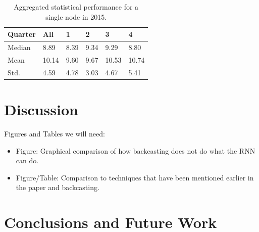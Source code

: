 \documentclass[sigconf]{acmart}
\begin{document}
\begin{table}[h]
\begin{tabular}{llllll}
\hline
Quarter & All   & 1    & 2    & 3     & 4     \\
\hline
Median  & 8.89  & 8.39 & 9.34 & 9.29  & 8.80  \\
Mean    & 10.14 & 9.60 & 9.67 & 10.53 & 10.74 \\
Std.    & 4.59  & 4.78 & 3.03 & 4.67  & 5.41 \\
\hline
\end{tabular}
\caption{Aggregated statistical performance for a single node in 2015.}
\label{tab:single}
\end{table}


\section{Discussion}
\label{sec:discussion}

Figures and Tables we will need:
\begin{itemize}
	\item Figure: Graphical comparison of how backcasting does not do what the RNN can do.
	\item Figure/Table: Comparison to techniques that have been mentioned earlier in the paper and backcasting.
\end{itemize}

\section{Conclusions and Future Work}
\label{sec:conclusions}

\end{document}
